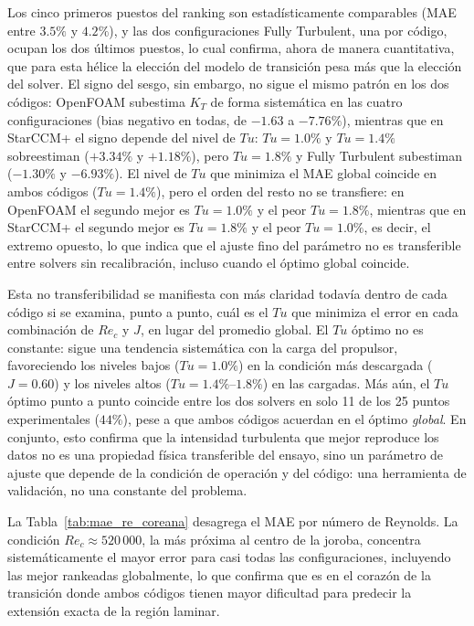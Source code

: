 Los cinco primeros puestos del ranking son estadísticamente comparables (MAE entre
$3.5\%$ y $4.2\%$), y las dos configuraciones Fully Turbulent, una por código, ocupan los dos últimos puestos, lo cual confirma, ahora de manera cuantitativa, que para esta hélice la elección del modelo de transición pesa más que la elección
del solver. El signo del sesgo, sin embargo, no sigue el mismo patrón en los dos
códigos: OpenFOAM subestima $K_T$ de forma sistemática en las cuatro
configuraciones (bias negativo en todas, de $-1.63$ a $-7.76\%$), mientras que en
StarCCM+ el signo depende del nivel de $Tu$: $Tu=1.0\%$ y $Tu=1.4\%$ sobreestiman ($+3.34\%$ y $+1.18\%$), pero $Tu=1.8\%$ y Fully Turbulent subestiman ($-1.30\%$ y
$-6.93\%$). El nivel de $Tu$ que minimiza el MAE global coincide en ambos
códigos ($Tu=1.4\%$), pero el orden del resto no se transfiere: en OpenFOAM el
segundo mejor es $Tu=1.0\%$ y el peor $Tu=1.8\%$, mientras que en StarCCM+ el
segundo mejor es $Tu=1.8\%$ y el peor $Tu=1.0\%$, es decir, el extremo opuesto, lo que
indica que el ajuste fino del parámetro no es transferible entre solvers sin
recalibración, incluso cuando el óptimo global coincide.

Esta no transferibilidad se manifiesta con más claridad todavía dentro de cada
código si se examina, punto a punto, cuál es el $Tu$ que minimiza el error en cada
combinación de $Re_c$ y $J$, en lugar del promedio global. El $Tu$ óptimo no es
constante: sigue una tendencia sistemática con la carga del propulsor, favoreciendo
los niveles bajos ($Tu=1.0\%$) en la condición más descargada ($J=0.60$) y los
niveles altos ($Tu=1.4\%$--$1.8\%$) en las cargadas. Más aún, el $Tu$ óptimo punto a
punto coincide entre los dos solvers en solo 11 de los 25 puntos experimentales
($44\%$), pese a que ambos códigos acuerdan en el óptimo \emph{global}. En
conjunto, esto confirma que la intensidad turbulenta que mejor reproduce los datos
no es una propiedad física transferible del ensayo, sino un parámetro de ajuste que
depende de la condición de operación y del código: una herramienta de validación, no
una constante del problema.

La Tabla~\ref{tab:mae_re_coreana} desagrega el MAE por número de Reynolds. La
condición $Re_c \approx 520\,000$, la más próxima al centro de la joroba, concentra
sistemáticamente el mayor error para casi todas las configuraciones, incluyendo las
mejor rankeadas globalmente, lo que confirma que es en el corazón de la transición
donde ambos códigos tienen mayor dificultad para predecir la extensión exacta de la
región laminar.

